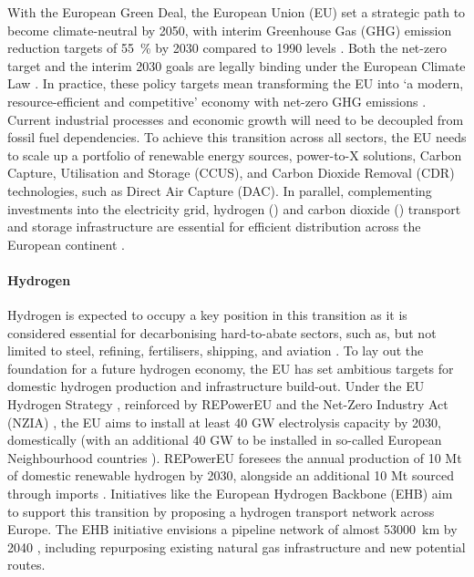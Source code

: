 \documentclass[final,5p,times,twocolumn,sort&compress]{elsarticle}
\begin{document}
With the European Green Deal, the European Union (EU) set a strategic path to become climate-neutral by 2050, with interim Greenhouse Gas (GHG) emission reduction targets of \SI{55}{\percent} by 2030 compared to 1990 levels \cite{europeancommissionFit55Delivering2021}. Both the net-zero target and the interim 2030 goals are legally binding under the European Climate Law \cite{europeanparliamentRegulationEU20212021}. In practice, these policy targets mean transforming the EU into `a modern, resource-efficient and competitive' economy with net-zero GHG emissions \cite{europeancommissionEuropeanGreenDeal2021}. Current industrial processes and economic growth will need to be decoupled from fossil fuel dependencies. To achieve this transition across all sectors, the EU needs to scale up a portfolio of renewable energy sources, power-to-X solutions, Carbon Capture, Utilisation and Storage (CCUS), and Carbon Dioxide Removal (CDR) technologies, such as Direct Air Capture (DAC). In parallel, complementing investments into the electricity grid, hydrogen () and carbon dioxide () transport and storage infrastructure are essential for efficient distribution across the European continent \cite{hofmannH2CO2Network2025}.

\paragraph{Hydrogen}
Hydrogen is expected to occupy a key position in this transition as it is considered essential for decarbonising hard-to-abate sectors, such as, but not limited to steel, refining, fertilisers, shipping, and aviation \cite{beresWillHydrogenSynthetic2024,neumannPotentialRoleHydrogen2023}. To lay out the foundation for a future hydrogen economy, the EU has set ambitious targets for domestic hydrogen production and infrastructure build-out. Under the EU Hydrogen Strategy \cite{europeancommissionCommunicationCommissionEuropean2020}, reinforced by REPowerEU \cite{europeancommissionREPowerEUPlanCommunication2022} and the Net-Zero Industry Act (NZIA) \cite{europeanparliamentRegulationEU20242024}, the EU aims to install at least 40 GW electrolysis capacity by 2030, domestically (with an additional 40 GW to be installed in so-called European Neighbourhood countries \cite{europeanparliamentRegulationEU20212021a}). REPowerEU foresees the annual production of 10 Mt of domestic renewable hydrogen by 2030, alongside an additional 10 Mt sourced through imports \cite{europeancommissionREPowerEUPlanCommunication2022}. Initiatives like the European Hydrogen Backbone (EHB) aim to support this transition by proposing a hydrogen transport network across Europe. The EHB initiative envisions a  pipeline network of almost \SI{53000}{km} by 2040 \cite{europeanhydrogenbackboneinitiativeEuropeanHydrogenBackbone2022}, including repurposing existing natural gas infrastructure and new potential routes.
\end{document}

